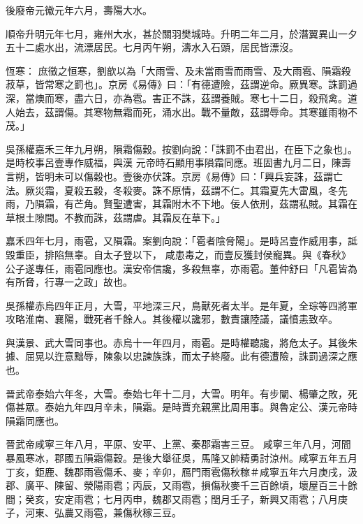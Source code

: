 \begin{pinyinscope}
 後廢帝元徽元年六月，壽陽大水。



 順帝升明元年七月，雍州大水，甚於關羽樊城時。升明二年二月，於潛翼異山一夕五十二處水出，流漂居民。七月丙午朔，濤水入石頭，居民皆漂沒。



 恆寒：
 庶徵之恒寒，劉歆以為「大雨雪、及未當雨雪而雨雪、及大雨雹、隕霜殺菽草，皆常寒之罰也」。京房《易傳》曰：「有德遭險，茲謂逆命。厥異寒。誅罰過深，當燠而寒，盡六日，亦為雹。害正不誅，茲謂養賊。寒七十二日，殺飛禽。道人始去，茲謂傷。其寒物無霜而死，涌水出。戰不量敵，茲謂辱命。其寒雖雨物不茂。」



 吳孫權嘉禾三年九月朔，隕霜傷穀。按劉向說：「誅罰不由君出，在臣下之象也」。是時校事呂壹專作威福，與漢
 元帝時石顯用事隕霜同應。班固書九月二日，陳壽言朔，皆明未可以傷穀也。壹後亦伏誅。京房《易傳》曰：「興兵妄誅，茲謂亡法。厥災霜，夏殺五穀，冬殺麥。誅不原情，茲謂不仁。其霜夏先大雷風，冬先雨，乃隕霜，有芒角。賢聖遭害，其霜附木不下地。佞人依刑，茲謂私賊。其霜在草根土隙間。不教而誅，茲謂虐。其霜反在草下。」



 嘉禾四年七月，雨雹，又隕霜。案劉向說：「雹者陰脅陽」。是時呂壹作威用事，詆毀重臣，排陷無辜。自太子登以下，
 咸患毒之，而壹反獲封侯寵異。與《春秋》公子遂專任，雨雹同應也。漢安帝信讒，多殺無辜，亦雨雹。董仲舒曰「凡雹皆為有所脅，行專一之政」故也。



 吳孫權赤烏四年正月，大雪，平地深三尺，鳥獸死者太半。是年夏，全琮等四將軍攻略淮南、襄陽，戰死者千餘人。其後權以讒邪，數責讓陸議，議憤恚致卒。



 與漢景、武大雪同事也。赤烏十一年四月，雨雹。是時權聽讒，將危太子。其後朱
 據、屈晃以迕意黜辱，陳象以忠諫族誅，而太子終廢。此有德遭險，誅罰過深之應也。



 晉武帝泰始六年冬，大雪。泰始七年十二月，大雪。明年。有步闡、楊肇之敗，死傷甚眾。泰始九年四月辛未，隕霜。是時賈充親黨比周用事。與魯定公、漢元帝時隕霜同應也。



 晉武帝咸寧三年八月，平原、安平、上黨、秦郡霜害三豆。
 咸寧三年八月，河間暴風寒冰，郡國五隕霜傷穀。是後大舉征吳，馬隆又帥精勇討涼州。咸寧五年五月丁亥，鉅鹿、魏郡雨雹傷禾、麥；辛卯，鴈門雨雹傷秋稼＃咸寧五年六月庚戌，汲郡、廣平、陳留、滎陽雨雹；丙辰，又雨雹，損傷秋麥千三百餘頃，壞屋百三十餘間；癸亥，安定雨雹；七月丙申，魏郡又雨雹；閏月壬子，新興又雨雹；八月庚子，河東、弘農又雨雹，兼傷秋稼三豆。




\end{pinyinscope}
